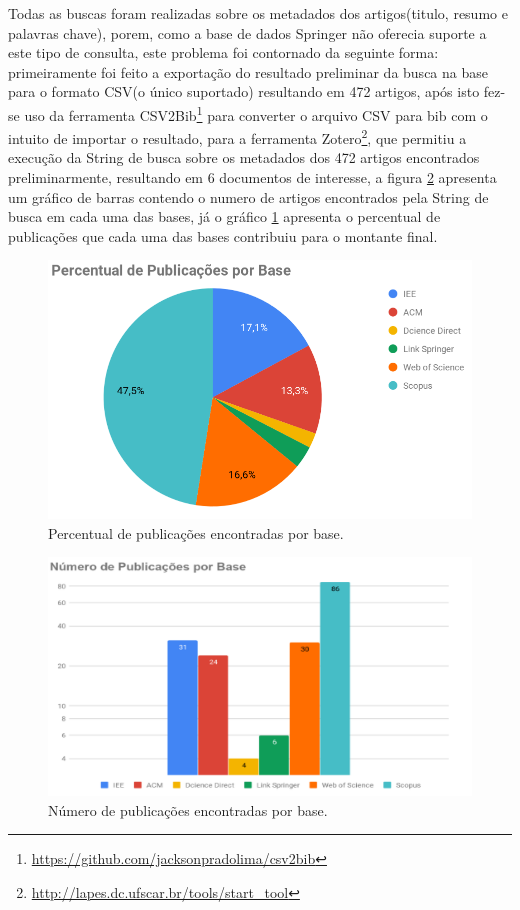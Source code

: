 \documentclass[tid,table]{texufpel} %
\begin{document}
Todas as buscas foram realizadas sobre os metadados dos artigos(titulo, resumo e palavras chave), porem, como a base de dados Springer não oferecia suporte a este tipo de consulta, este problema foi contornado da seguinte forma: primeiramente foi feito a exportação do resultado preliminar da busca na base para o formato CSV(o único suportado) resultando em 472 artigos, após isto fez-se uso da ferramenta CSV2Bib\footnote{\url{https://github.com/jacksonpradolima/csv2bib}} para converter o arquivo CSV para bib com o intuito de importar o resultado, para a ferramenta Zotero\footnote{\url{http://lapes.dc.ufscar.br/tools/start_tool}}, que permitiu a execução da String de busca sobre os metadados dos 472 artigos encontrados preliminarmente, resultando em 6 documentos de interesse, a figura  \ref{fig:GrafBarraPubAno} apresenta um gráfico de barras contendo o numero de artigos encontrados pela String de busca em cada uma das bases, já o gráfico \ref{fig:GrafPizPubAno} apresenta o percentual de publicações que cada uma das bases contribuiu para o montante final.

\begin{figure}[ht]
	\centering
	\includegraphics[width=.9\textwidth]{imagens/GrafPizPubAno.png}
	\caption{Percentual de publicações encontradas por base.}
	\label{fig:GrafPizPubAno}
\end{figure}

\begin{figure}[ht]
	\centering
	\includegraphics[width=.9\textwidth]{imagens/GrafBarraPubAno.png}
	\caption{Número de publicações encontradas por base.}
	\label{fig:GrafBarraPubAno}
\end{figure}
\end{document}
